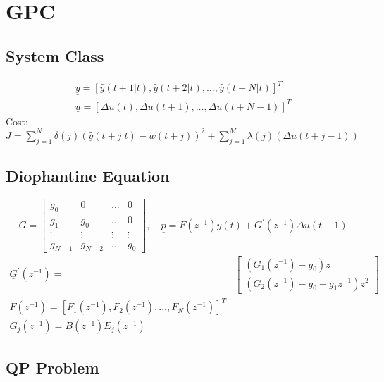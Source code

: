 \documentclass[english]{latex4ei/latex4ei_sheet}
\begin{document}
\section{GPC}
\begin{sectionbox}

\subsection{System Class}
$$
\begin{array}{l}{\underline{y}=[\hat{y}(t+1 | t), \hat{y}(t+2 | t), \ldots, \hat{y}(t+N | t)]^{T}} \\ 
\underline{u}=[\Delta u(t), \Delta u(t+1), \ldots, \Delta u(t+N-1)]^{T}
\end{array}
$$
Cost: $J=\sum_{j=1}^{N} \delta(j)(\hat{y}(t+j | t)-w(t+j))^{2}+\sum_{j=1}^{M} \lambda(j)(\Delta u(t+j-1))
$

\subsection{Diophantine Equation}
$$
G=\left[\begin{array}{cccc}{g_{0}} & {0} & {\dots} & {0} \\ {g_{1}} & {g_{0}} & {\dots} & {0} \\ {\vdots} & {\vdots} & {\vdots} & {\vdots} \\ {g_{N-1}} & {g_{N-2}} & {\dots} & {g_{0}}\end{array}\right], \quad \underline{p}=\underline{F}\left(z^{-1}\right) y(t)+\underline{G}^{\prime}\left(z^{-1}\right) \Delta u(t-1)
$$
$$
\begin{aligned} \underline{G}^{\prime}\left(z^{-1}\right)=&\left[\begin{array}{c}{\left(G_{1}\left(z^{-1}\right)-g_{0}\right) z} \\ {\left(G_{2}\left(z^{-1}\right)-g_{0}-g_{1} z^{-1}\right) z^{2}}\end{array}\right] \\ \underline{F}\left(z^{-1}\right)=\left[F_{1}\left(z^{-1}\right), F_{2}\left(z^{-1}\right), \ldots, F_{N}\left(z^{-1}\right)\right]^{T} \\ G_{j}\left(z^{-1}\right)=B\left(z^{-1}\right) E_{j}\left(z^{-1}\right) \end{aligned}
$$

\subsection{QP Problem}

\end{sectionbox}
\end{document}
